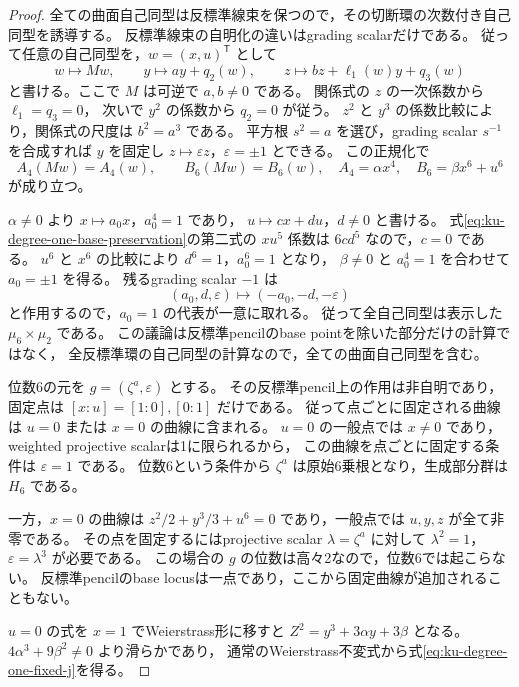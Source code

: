\begin{proof}
全ての曲面自己同型は反標準線束を保つので，その切断環の次数付き自己同型を誘導する。
反標準線束の自明化の違いはgrading scalarだけである。
従って任意の自己同型を，$w=(x,u)^{\mathsf T}$ として
\[
 w\longmapsto Mw,\qquad
 y\longmapsto ay+q_2(w),\qquad
 z\longmapsto bz+\ell_1(w)y+q_3(w)
\]
と書ける。ここで $M$ は可逆で $a,b\ne0$ である。
関係式の $z$ の一次係数から $\ell_1=q_3=0$，
次いで $y^2$ の係数から $q_2=0$ が従う。
$z^2$ と $y^3$ の係数比較により，関係式の尺度は
$b^2=a^3$ である。
平方根 $s^2=a$ を選び，grading scalar $s^{-1}$ を合成すれば
$y$ を固定し $z\mapsto\varepsilon z$，$\varepsilon=\pm1$ とできる。
この正規化で
\begin{equation}\label{eq:ku-degree-one-base-preservation}
 A_4(Mw)=A_4(w),\qquad B_6(Mw)=B_6(w),
 \quad A_4=\alpha x^4,\quad B_6=\beta x^6+u^6
\end{equation}
が成り立つ。

$\alpha\ne0$ より $x\mapsto a_0x$，$a_0^4=1$ であり，
$u\mapsto cx+du$，$d\ne0$ と書ける。
式\eqref{eq:ku-degree-one-base-preservation}の第二式の $xu^5$ 係数は
$6cd^5$ なので，$c=0$ である。
$u^6$ と $x^6$ の比較により $d^6=1$，$a_0^6=1$ となり，
$\beta\ne0$ と $a_0^4=1$ を合わせて $a_0=\pm1$ を得る。
残るgrading scalar $-1$ は
\[
 (a_0,d,\varepsilon)\longmapsto(-a_0,-d,-\varepsilon)
\]
と作用するので，$a_0=1$ の代表が一意に取れる。
従って全自己同型は表示した $\mu_6\times\mu_2$ である。
この議論は反標準pencilのbase pointを除いた部分だけの計算ではなく，
全反標準環の自己同型の計算なので，全ての曲面自己同型を含む。

位数6の元を $g=(\zeta^a,\varepsilon)$ とする。
その反標準pencil上の作用は非自明であり，固定点は
$[x:u]=[1:0],[0:1]$ だけである。
従って点ごとに固定される曲線は $u=0$ または $x=0$ の曲線に含まれる。
$u=0$ の一般点では $x\ne0$ であり，weighted projective scalarは1に限られるから，
この曲線を点ごとに固定する条件は $\varepsilon=1$ である。
位数6という条件から $\zeta^a$ は原始6乗根となり，生成部分群は $H_6$ である。

一方，$x=0$ の曲線は
$z^2/2+y^3/3+u^6=0$ であり，一般点では $u,y,z$ が全て非零である。
その点を固定するにはprojective scalar $\lambda=\zeta^a$ に対して
$\lambda^2=1$，$\varepsilon=\lambda^3$ が必要である。
この場合の $g$ の位数は高々2なので，位数6では起こらない。
反標準pencilのbase locusは一点であり，ここから固定曲線が追加されることもない。

$u=0$ の式を $x=1$ でWeierstrass形に移すと
$Z^2=y^3+3\alpha y+3\beta$ となる。
$4\alpha^3+9\beta^2\ne0$ より滑らかであり，
通常のWeierstrass不変式から式\eqref{eq:ku-degree-one-fixed-j}を得る。
\end{proof}


